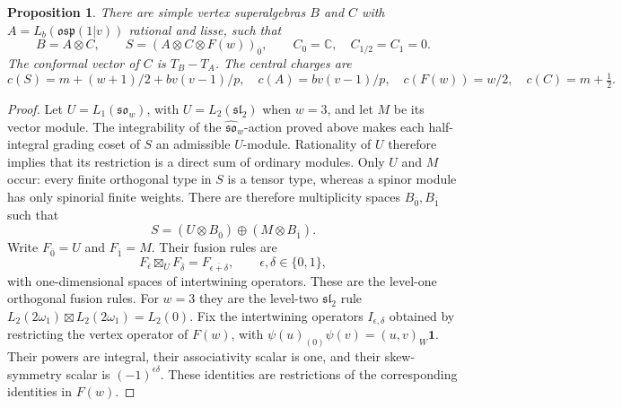 \documentclass[11pt,a4paper]{amsart}
\numberwithin{equation}{section}
\newtheorem{proposition}[theorem]{Proposition}
\theoremstyle{definition}
\theoremstyle{remark}
\newcommand{\sog}{\mathfrak{so}}
\newcommand{\slg}{\mathfrak{sl}}
\begin{document}
\begin{proposition}\label{seed:D-tensor-realization}
There are simple vertex superalgebras $B$ and $C$ with
$A=L_b(\mathfrak{osp}(1|v))$ rational and lisse, such that
\begin{equation}\label{seed:D-tensor}
 B=A\otimes C,\qquad
 S=(A\otimes C\otimes F(w))_{\overline0},\qquad
 C_0=\mathbb C,\quad C_{1/2}=C_1=0.
\end{equation}
The conformal vector of $C$ is $T_B-T_A$. The central charges are
$$
 c(S)=m+(w+1)/2+bv(v-1)/p,\quad c(A)=bv(v-1)/p,
 \quad c(F(w))=w/2,\quad c(C)=m+\tfrac12.
$$

\end{proposition}
\begin{proof}
Let $U=L_1(\mathfrak{so}_w)$, with
$U=L_2(\mathfrak{sl}_2)$ when $w=3$, and let $M$ be its vector module.
The integrability of the $\widehat{\sog}_w$-action proved above makes each half-integral grading
coset of $S$ an admissible $U$-module. Rationality of $U$ therefore
implies that its restriction is a direct sum of ordinary modules.
Only $U$ and $M$ occur: every finite orthogonal type in $S$ is a tensor
type, whereas a spinor module has only spinorial finite weights.
There are therefore multiplicity spaces $B_{\overline0},B_{\overline1}$
such that
$$
 S=(U\otimes B_{\overline0})\oplus(M\otimes B_{\overline1}).
$$
Write $F_{\overline0}=U$ and $F_{\overline1}=M$. Their fusion rules are
$$
 F_{\bar\epsilon}\boxtimes_U F_{\bar\delta}
   =F_{\overline{\epsilon+\delta}},
 \qquad \epsilon,\delta\in\{0,1\},
$$
with one-dimensional spaces of intertwining operators. These are
the level-one orthogonal fusion rules. For $w=3$ they are the
level-two $\slg_2$ rule
$L_2(2\omega_1)\boxtimes L_2(2\omega_1)=L_2(0)$.
Fix the intertwining operators $I_{\epsilon,\delta}$ obtained by
restricting the vertex operator of $F(w)$, with
$\psi(u)_{(0)}\psi(v)=(u,v)_W\mathbf1$.
Their powers are integral, their associativity scalar is one,
and their skew-symmetry scalar is $(-1)^{\epsilon\delta}$.
These identities are restrictions of the corresponding identities
in $F(w)$.


\end{proof}
\end{document}
